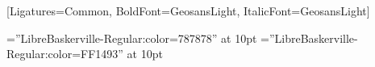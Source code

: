 \setsansfont{GeosansLight}[Ligatures={Common}, BoldFont={GeosansLight}, ItalicFont={GeosansLight}]

\setmonofont{Consolas}

\font\lighttext=''LibreBaskerville-Regular:color=787878'' at 10pt
\font\lighttextweb=''LibreBaskerville-Regular:color=FF1493'' at 10pt

\titleformat{\section}{\Large\scshape\raggedright}{}{0em}{}[\titlerule]
\titlespacing{\section}{0pt}{4pt}{3pt}
\setlength{\parindent}{0pt}

\newcommand{\institution}{\textsc}
\newenvironment{education}
{
	\begin{tabu} to \textwidth {@{} X[1,r] | X[5,l] @{}}
}
{
	\end{tabu}
}
\newcommand{\degree}[4]{
	\textsc{#1} & \begin{tabu}{@{} X @{}}
		\textbf{#2},~\textsc{#3},~#4
	\end{tabu}\\
	\multicolumn{2}{c}{}\\ [-1ex]
}
\newenvironment{experiences}
{
	\begin{tabu} to \textwidth {@{} X[1,r] | X[5,l] @{}}
}
{
	\end{tabu}
}
\newcommand{\experience}[5]{
	\textsc{#1} & \begin{tabu}{@{} X @{}}
		\textbf{#2} #3 \textsc{#4}\\
		#5
	\end{tabu}\\
	\multicolumn{2}{c}{}\\ [-1ex]
}
\newenvironment{skillslisting}
{
	\begin{multicols}{4}
	\raggedcolumns
	\begin{itemize}
	\renewcommand{\labelitemi}{}
	\renewcommand{\skill}{\textnormal}
	\setlength{\itemsep}{0pt}
	\setlength{\parskip}{0pt}
	\setlength{\parsep}{0pt}
}
{
	\end{itemize}
	\end{multicols}
}

\newcommand{\skills}[2]{
	\item #1 #2
}
\newcommand{\skill}{\textbf}
\newcommand{\proj}[3]{
	\textsc{#1} & #2\\
	&\href{http://www.#3}{#3}\\
	\multicolumn{2}{c}{} \\ [-1ex]
}
\newcommand{\projl}[3]{
	\textsc{#1} & #2\\
	&\href{http://www.#3}{#3}\\
}
\newcommand{\projlh}[4]{
	\textsc{#1} & #2\\
	&\href{#3}{#4}\\
}

